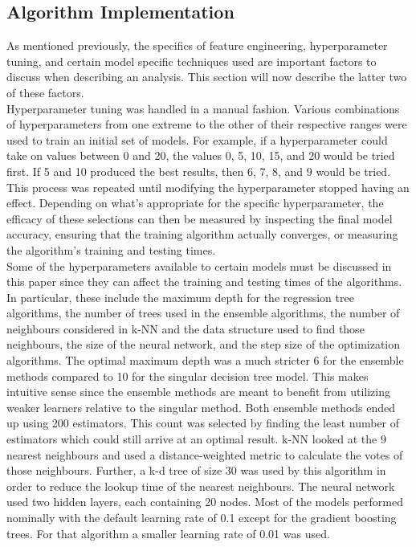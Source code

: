 \documentclass[titlepage]{article}
\begin{document}
\subsection{Algorithm Implementation}
As mentioned previously, the specifics of feature engineering, hyperparameter tuning, and certain model specific techniques used are important factors to discuss when describing an analysis. This section will now describe the latter two of these factors.\\
Hyperparameter tuning was handled in a manual fashion. Various combinations of hyperparameters from one extreme to the other of their respective ranges were used to train an initial set of models. For example, if a hyperparameter could take on values between 0 and 20, the values 0, 5, 10, 15, and 20 would be tried first. If 5 and 10 produced the best results, then 6, 7, 8, and 9 would be tried. This process was repeated until modifying the hyperparameter stopped having an effect. Depending on what's appropriate for the specific hyperparameter, the efficacy of these selections can then be measured by inspecting the final model accuracy, ensuring that the training algorithm actually converges, or measuring the algorithm's training and testing times.\\
Some of the hyperparameters available to certain models must be discussed in this paper since they can affect the training and testing times of the algorithms. In particular, these include the maximum depth for the regression tree algorithms, the number of trees used in the ensemble algorithms, the number of neighbours considered in k-NN and the data structure used to find those neighbours, the size of the neural network, and the step size of the optimization algorithms. The optimal maximum depth was a much stricter 6 for the ensemble methods compared to 10 for the singular decision tree model. This makes intuitive sense since the ensemble methods are meant to benefit from utilizing weaker learners relative to the singular method. Both ensemble methods ended up using 200 estimators. This count was selected by finding the least number of estimators which could still arrive at an optimal result. k-NN looked at the 9 nearest neighbours and used a distance-weighted metric to calculate the votes of those neighbours. Further, a k-d tree of size 30 was used by this algorithm in order to reduce the lookup time of the nearest neighbours. The neural network used two hidden layers, each containing 20 nodes. Most of the models performed nominally with the default learning rate of 0.1 except for the gradient boosting trees. For that algorithm a smaller learning rate of 0.01 was used.
\end{document}
